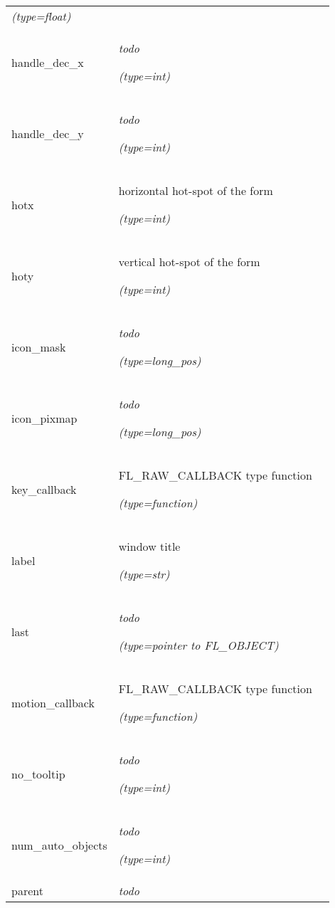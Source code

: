 \begin{longtable}{|p{\varnamewidth}|p{\vardescrwidth}|l}
            {\it (type=float)}&\\
\cline{1-2}
\raggedright h\-a\-n\-d\-l\-e\-\_\-d\-e\-c\-\_\-x\- & \raggedright \emph{todo}

            {\it (type=int)}&\\
\cline{1-2}
\raggedright h\-a\-n\-d\-l\-e\-\_\-d\-e\-c\-\_\-y\- & \raggedright \emph{todo}

            {\it (type=int)}&\\
\cline{1-2}
\raggedright h\-o\-t\-x\- & \raggedright horizontal hot-spot of the form

            {\it (type=int)}&\\
\cline{1-2}
\raggedright h\-o\-t\-y\- & \raggedright vertical hot-spot of the form

            {\it (type=int)}&\\
\cline{1-2}
\raggedright i\-c\-o\-n\-\_\-m\-a\-s\-k\- & \raggedright \emph{todo}

            {\it (type=long\_pos)}&\\
\cline{1-2}
\raggedright i\-c\-o\-n\-\_\-p\-i\-x\-m\-a\-p\- & \raggedright \emph{todo}

            {\it (type=long\_pos)}&\\
\cline{1-2}
\raggedright k\-e\-y\-\_\-c\-a\-l\-l\-b\-a\-c\-k\- & \raggedright FL\_RAW\_CALLBACK type function

            {\it (type=function)}&\\
\cline{1-2}
\raggedright l\-a\-b\-e\-l\- & \raggedright window title

            {\it (type=str)}&\\
\cline{1-2}
\raggedright l\-a\-s\-t\- & \raggedright \emph{todo}

            {\it (type=pointer to FL\_OBJECT)}&\\
\cline{1-2}
\raggedright m\-o\-t\-i\-o\-n\-\_\-c\-a\-l\-l\-b\-a\-c\-k\- & \raggedright FL\_RAW\_CALLBACK type function

            {\it (type=function)}&\\
\cline{1-2}
\raggedright n\-o\-\_\-t\-o\-o\-l\-t\-i\-p\- & \raggedright \emph{todo}

            {\it (type=int)}&\\
\cline{1-2}
\raggedright n\-u\-m\-\_\-a\-u\-t\-o\-\_\-o\-b\-j\-e\-c\-t\-s\- & \raggedright \emph{todo}

            {\it (type=int)}&\\
\cline{1-2}
\raggedright p\-a\-r\-e\-n\-t\- & \raggedright \emph{todo}


\end{longtable}
